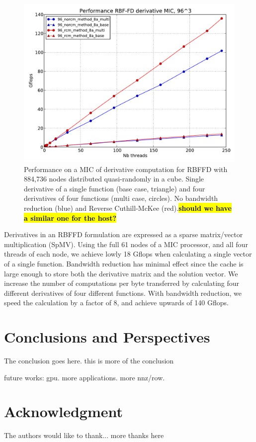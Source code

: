 \documentclass[10pt,conference,compsocconf]{IEEEtran}
\newcommand{\todo}[1]{{\color{red}\textbf{\hl{#1}}\xspace}}
\begin{document}
\begin{figure}
  \centering
  \includegraphics[width=\linewidth]{figures/plot_for_natasha_ncar_end_of_year.pdf}

  \caption{Performance on a MIC of derivative computation for RBFFD
    with 884,736 nodes distributed quasi-randomly in a cube. Single
    derivative of a single function (base case, triangle) and four
    derivatives of four functions (multi case, circles). No bandwidth
    reduction (blue) and Reverse Cuthill-McKee (red).\todo{should we have a similar one for the host?}}
\end{figure}

Derivatives in an RBFFD formulation are expressed as a sparse
matrix/vector multiplication (SpMV). Using the full 61 nodes of a MIC
processor, and all four threads of each node, we achieve lowly 18
Gflops when calculating a single vector of a single
function. Bandwidth reduction has minimal effect since the cache is
large enough to store both the derivative matrix and the solution
vector. We increase the number of computations per byte transferred by
calculating four different derivatives of four different
functions. With bandwidth reduction, we speed the calculation by a
factor of 8, and achieve upwards of 140 Gflops.


\section{Conclusions and Perspectives}
\label{sec:ccl}

The conclusion goes here. this is more of the conclusion

future works: gpu. more applications. more nnz/row.

\section*{Acknowledgment}

The authors would like to thank...
more thanks here



\end{document}
